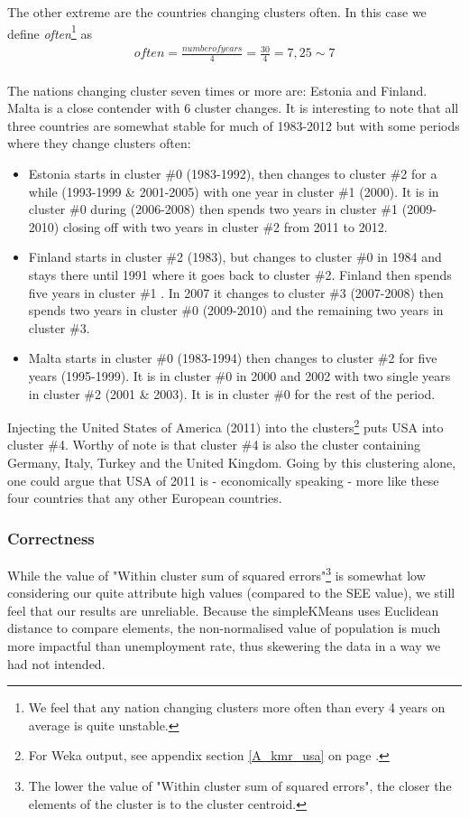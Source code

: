 The other extreme are the countries changing clusters often. In this case we define \textit{often}\footnote{We feel that any nation changing clusters more often than every 4 years on average is quite unstable.} as 
\begin{align*}
often = \frac{number of years}{4} = \frac{30}{4} = 7,25 \sim 7
\end{align*} 
\\The nations changing cluster seven times or more are: Estonia and Finland. Malta is a close contender with 6 cluster changes. It is interesting to note that all three countries are somewhat stable for much of 1983-2012 but with some periods where they change clusters often:

\begin{itemize}
\item Estonia starts in cluster \#0 (1983-1992), then changes to cluster \#2 for a while (1993-1999 \& 2001-2005) with one year in cluster \#1 (2000). It is in cluster \#0 during (2006-2008) then spends two years in cluster \#1 (2009-2010) closing off with two years in cluster \#2 from 2011 to 2012.
\item Finland starts in cluster \#2 (1983), but changes to cluster \#0 in 1984 and stays there until 1991 where it goes back to cluster \#2. Finland then spends five years in cluster \#1 . In 2007 it changes to cluster \#3 (2007-2008) then spends two years in cluster \#0 (2009-2010) and the remaining two years in cluster \#3.
\item Malta starts in cluster \#0 (1983-1994) then changes to cluster \#2 for five years (1995-1999). It is in cluster \#0 in 2000 and 2002 with two single years in cluster \#2 (2001 \& 2003). It is in cluster \#0 for the rest of the period.
\end{itemize}

Injecting the United States of America (2011) into the clusters\footnote{For Weka output, see appendix section \ref{A_kmr_usa} on page \pageref{A_kmr_usa}.} puts USA into cluster \#4. Worthy of note is that cluster \#4 is also the cluster containing Germany, Italy, Turkey and the United Kingdom. Going by this clustering alone, one could argue that USA of 2011 is - economically speaking - more like these four countries that any other European countries.

\subsubsection*{Correctness}
\label{Res_Clu_Cor}
While the value of "Within cluster sum of squared errors"\footnote{The lower the value of "Within cluster sum of squared errors", the closer the elements of the cluster is to the cluster centroid.} is somewhat low considering our quite attribute high values (compared to the SEE value), we still feel that our results are unreliable. Because the simpleKMeans uses Euclidean distance to compare elements, the non-normalised value of population is much more impactful than unemployment rate, thus skewering the data in a way we had not intended.